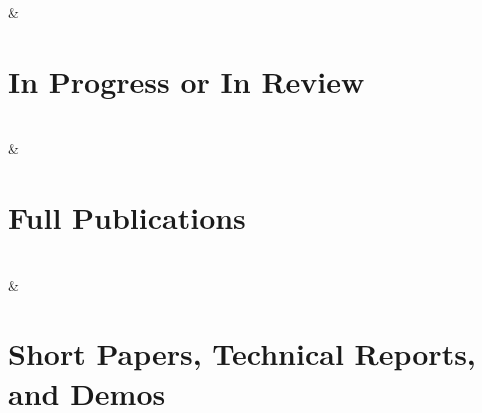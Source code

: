 


&\section{In Progress or In Review}\\



&\section{Full Publications}\\


&\section{Short Papers, Technical Reports, and Demos}\\
